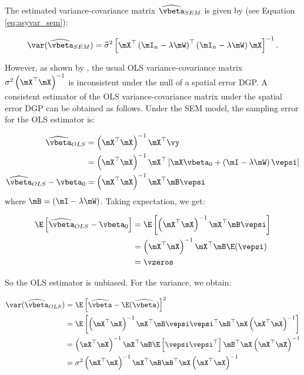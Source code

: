 \documentclass[english,12pt]{book}\usepackage[]{graphicx}\usepackage[]{xcolor}
\begin{document}
The estimated variance-covariance matrix $\widehat{\vbeta}_{SEM}$ is given by (see Equation \ref{eq:asyvar_sem}):

\begin{equation}
\var(\widehat{\vbeta}_{SEM})=\widehat{\sigma}^2\left[\mX^\top\left(\mI_n-\lambda\mW\right)^\top\left(\mI_n-\lambda\mW\right)\mX\right]^{-1}.
\end{equation}

However, as shown by \cite{cordy1993efficiency}, the usual OLS variance-covariance matrix $\sigma^2\left(\mX^\top\mX\right)^{-1}$ is inconsistent under the null of a spatial error DGP. A consistent estimator of the OLS variance-covariance matrix under the spatial error DGP can be obtained as follows. Under the SEM model, the sampling error for the OLS estimator is:
    
    \begin{equation*}
      \begin{aligned}
        \widehat{\vbeta}_{OLS} & =\left(\mX^\top\mX\right)^{-1}\mX^\top\vy \\
                         & = \left(\mX^\top\mX\right)^{-1}\mX^\top\left[\mX\vbeta_0 + \left(\mI - \lambda\mW\right)\vepsi\right]\\
         \widehat{\vbeta}_{OLS} -\vbeta_0 & =   \left(\mX^\top\mX\right)^{-1}\mX^\top\mB\vepsi            
      \end{aligned}
    \end{equation*}
    where $\mB = \left(\mI - \lambda\mW\right)$. Taking expectation, we get:
    
    \begin{equation*}
      \begin{aligned}
      \E\left[\widehat{\vbeta}_{OLS} -\vbeta_0\right] & = \E\left[\left(\mX^\top\mX\right)^{-1}\mX^\top\mB\vepsi \right] \\
                                                & = \left(\mX^\top\mX\right)^{-1}\mX^\top\mB\E(\vepsi) \\
                                                & = \vzeros
      \end{aligned}
    \end{equation*}
    
    So the OLS estimator is unbiased. For the variance, we obtain:
    
    \begin{equation}\label{eq:var-ols-sem}
      \begin{aligned}
        \var(\widehat{\vbeta}_{OLS}) & = \E\left[\widehat{\vbeta}-\E(\widehat{\vbeta})\right]^2 \\
                               & = \E\left[\left(\mX^\top\mX\right)^{-1}\mX^\top\mB\vepsi\vepsi^\top\mB^\top\mX\left(\mX^\top\mX\right)^{-1}\right] \\
                               & = \left(\mX^\top\mX\right)^{-1}\mX^\top\mB\E\left[\vepsi\vepsi^\top\right]\mB^\top\mX\left(\mX^\top\mX\right)^{-1} \\
                               & = \sigma^2\left(\mX^\top\mX\right)^{-1}\mX^\top\mB\mB^\top\mX\left(\mX^\top\mX\right)^{-1}
      \end{aligned}
    \end{equation}
    
\end{document}
